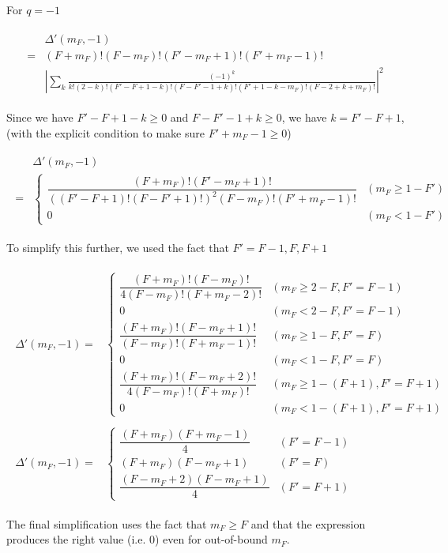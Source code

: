 \documentclass[10pt,fleqn]{article}
\newcommand{\eqar}[1]
{
  \begin{align}
    #1
  \end{align}
}
\newcommand{\paren}[1]{{\left({#1}\right)}}
\newcommand{\abs}[1]{{\left|{#1}\right|}}
\begin{document}
For $q=-1$
\eqar{
  \begin{split}
    &\Delta'(m_F,-1)\\
    =&(F+m_F)!(F-m_F)!(F'-m_F+1)!(F'+m_F-1)!\\
    &\abs{\sum_{k}\frac{(-1)^k}{k!(2\!-\!k)!(F'\!-\!F\!+\!1\!-\!k)!(F\!-\!F'\!-\!1\!+\!k)!(F'\!+\!1\!-\!k\!-\!m_F)!(F\!-\!2\!+\!k\!+\!m_F)!}}^2
  \end{split}
}
Since we have $F'\!-\!F\!+\!1\!-\!k\geqslant0$ and $F\!-\!F'\!-\!1\!+\!k\geqslant0$, we have $k=F'-F+1$, (with the explicit condition to make sure $F'+m_F-1\geqslant0$)
\eqar{
  \begin{split}
    &\Delta'(m_F,-1)\\
    =&\begin{cases}
      \dfrac{(F+m_F)!(F'-m_F+1)!}{\paren{(F'-F+1)!(F-F'+1)!}^2(F-m_F)!(F'+m_F-1)!}&(m_F\geqslant1-F')\\
      0&(m_F<1-F')
    \end{cases}
  \end{split}
}
To simplify this further, we used the fact that $F'=F-1,F,F+1$
\eqar{
  \begin{split}
    \Delta'(m_F,-1)=&\begin{cases}
      \dfrac{(F+m_F)!(F-m_F)!}{4(F-m_F)!(F+m_F-2)!}&(m_F\geqslant2-F,F'=F-1)\\
      0&(m_F<2-F,F'=F-1)\\
      \dfrac{(F+m_F)!(F-m_F+1)!}{(F-m_F)!(F+m_F-1)!}&(m_F\geqslant1-F,F'=F)\\
      0&(m_F<1-F,F'=F)\\
      \dfrac{(F+m_F)!(F-m_F+2)!}{4(F-m_F)!(F+m_F)!}&(m_F\geqslant1-(F+1),F'=F+1)\\
      0&(m_F<1-(F+1),F'=F+1)
    \end{cases}
  \end{split}\\
  \begin{split}
    \Delta'(m_F,-1)=&\begin{cases}
      \dfrac{(F+m_F)(F+m_F-1)}{4}&(F'=F-1)\\
      (F+m_F)(F-m_F+1)&(F'=F)\\
      \dfrac{(F-m_F+2)(F-m_F+1)}{4}&(F'=F+1)
    \end{cases}
  \end{split}
}
The final simplification uses the fact that $m_F\geqslant F$
and that the expression produces the right value (i.e. $0$) even for out-of-bound $m_F$.
\end{document}
